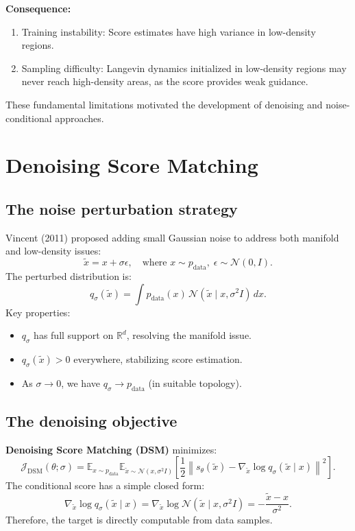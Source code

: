 \documentclass[11pt]{article}
\theoremstyle{definition}
\begin{document}
\textbf{Consequence:} 
\begin{enumerate}
\item Training instability: Score estimates have high variance in low-density regions.
\item Sampling difficulty: Langevin dynamics initialized in low-density regions may never reach high-density areas, as the score provides weak guidance.
\end{enumerate}

These fundamental limitations motivated the development of denoising and noise-conditional approaches.

\section{Denoising Score Matching}

\subsection{The noise perturbation strategy}
Vincent (2011) proposed adding small Gaussian noise to address both manifold and low-density issues:
\begin{equation}
\tilde{x} = x + \sigma \epsilon, \quad \text{where } x \sim p_{\text{data}}, \; \epsilon \sim \mathcal{N}(0, I).
\end{equation}
The perturbed distribution is:
\begin{equation}
q_\sigma(\tilde{x}) = \int p_{\text{data}}(x) \, \mathcal{N}(\tilde{x} \mid x, \sigma^2 I) \, dx.
\end{equation}
Key properties:
\begin{itemize}
\item $q_\sigma$ has full support on $\mathbb{R}^d$, resolving the manifold issue.
\item $q_\sigma(\tilde{x}) > 0$ everywhere, stabilizing score estimation.
\item As $\sigma \to 0$, we have $q_\sigma \to p_{\text{data}}$ (in suitable topology).
\end{itemize}

\subsection{The denoising objective}
\textbf{Denoising Score Matching (DSM)} minimizes:
\begin{equation}
\label{eq:dsm}
\mathcal{J}_{\text{DSM}}(\theta; \sigma)
= \mathbb{E}_{x\sim p_{\text{data}}}\mathbb{E}_{\tilde{x}\sim \mathcal{N}(x,\sigma^2 I)}
\left[\frac{1}{2} \left\| s_\theta(\tilde{x}) - \nabla_{\tilde{x}}\log q_\sigma(\tilde{x}\mid x)\right\|^2\right].
\end{equation}
The conditional score has a simple closed form:
\begin{equation}
\nabla_{\tilde{x}}\log q_\sigma(\tilde{x}\mid x) = \nabla_{\tilde{x}}\log \mathcal{N}(\tilde{x}\mid x,\sigma^2 I) = -\frac{\tilde{x} - x}{\sigma^2}.
\end{equation}
Therefore, the target is directly computable from data samples.
\end{document}
